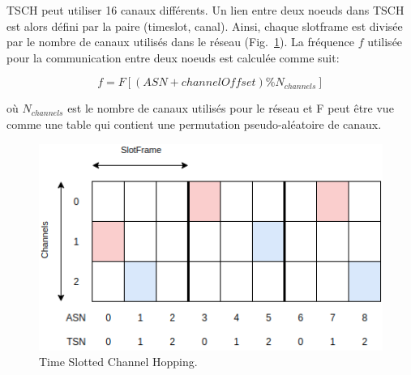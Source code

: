 TSCH peut utiliser 16 canaux différents. Un lien entre deux noeuds dans TSCH est alors défini par la paire (timeslot, canal). Ainsi, chaque slotframe est divisée par le nombre de canaux utilisés dans le réseau (Fig.~\ref{fig:state-tsch}). La fréquence $f$ utilisée pour la communication entre deux noeuds est calculée comme suit:

\[
    f = F[(ASN + channel Offset)\% N_{channels}]
\]

où $N_{channels}$ est le nombre de canaux utilisés pour le réseau et F peut être vue comme une table qui contient une permutation pseudo-aléatoire de canaux.

\begin{figure}[H]
    \centering
    \includegraphics[scale=0.5]{res/pictures/tsch.drawio.png}
    \caption{Time Slotted Channel Hopping.}
    \label{fig:state-tsch}
\end{figure}



